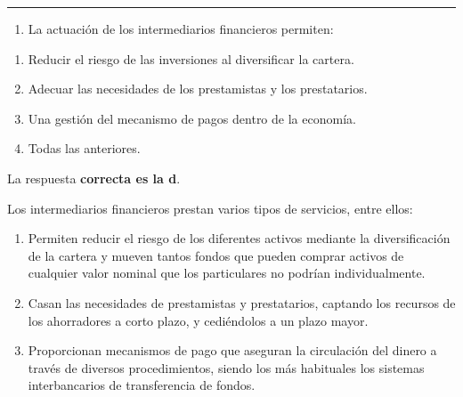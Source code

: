 \documentclass[
  letterpaper,
  DIV=11,
  numbers=noendperiod]{scrreprt}
\providecommand{\tightlist}{%
  \setlength{\itemsep}{0pt}\setlength{\parskip}{0pt}}\usepackage{longtable,booktabs,array}
\begin{document}
\begin{center}\rule{0.5\linewidth}{0.5pt}\end{center}

\begin{enumerate}
\def\labelenumi{\arabic{enumi}.}
\setcounter{enumi}{5}
\tightlist
\item
  La actuación de los intermediarios financieros permiten:
\end{enumerate}

\begin{enumerate}
\def\labelenumi{\alph{enumi})}
\item
  Reducir el riesgo de las inversiones al diversificar la cartera.
\item
  Adecuar las necesidades de los prestamistas y los prestatarios.
\item
  Una gestión del mecanismo de pagos dentro de la economía.
\item
  Todas las anteriores.
\end{enumerate}

\begin{tcolorbox}[enhanced jigsaw, left=2mm, opacityback=0, colback=white, breakable, arc=.35mm, bottomrule=.15mm, rightrule=.15mm, toprule=.15mm, leftrule=.75mm, colframe=quarto-callout-tip-color-frame]
\begin{minipage}[t]{5.5mm}
\textcolor{quarto-callout-tip-color}{\faLightbulb}
\end{minipage}%
\begin{minipage}[t]{\textwidth - 5.5mm}

La respuesta \textbf{correcta es la d}.

Los intermediarios financieros prestan varios tipos de servicios, entre
ellos:

\begin{enumerate}
\def\labelenumi{\arabic{enumi}.}
\item
  Permiten reducir el riesgo de los diferentes activos mediante la
  diversificación de la cartera y mueven tantos fondos que pueden
  comprar activos de cualquier valor nominal que los particulares no
  podrían individualmente.
\item
  Casan las necesidades de prestamistas y prestatarios, captando los
  recursos de los ahorradores a corto plazo, y cediéndolos a un plazo
  mayor.
\item
  Proporcionan mecanismos de pago que aseguran la circulación del dinero
  a través de diversos procedimientos, siendo los más habituales los
  sistemas interbancarios de transferencia de fondos.
\end{enumerate}

\end{minipage}%
\end{tcolorbox}
\end{document}
